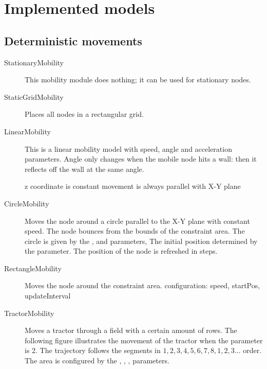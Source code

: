\section{Implemented models}

\subsection{Deterministic movements}

\begin{description}

\item[StationaryMobility] This mobility module does nothing;
it can be used for stationary nodes.

\item[StaticGridMobility] Places all nodes in a rectangular grid.


\item[LinearMobility] This is a linear mobility model with speed,
angle and acceleration parameters. Angle only changes when the mobile
node hits a wall: then it reflects off the wall at the same angle.

z coordinate is constant
movement is always parallel with X-Y plane


\item[CircleMobility] Moves the node around a circle parallel to the X-Y plane
with constant speed.
The node bounces from the bounds of the constraint area.
The circle is given by the ,  and  parameters,
The initial position determined by the  parameter.
The position of the node is refreshed in  steps.

\item[RectangleMobility] Moves the node around the constraint area.
configuration: speed, startPos, updateInterval

\item[TractorMobility] Moves a tractor through a field with a certain
amount of rows. The following figure illustrates the movement of the
tractor when the  parameter is 2. The trajectory follows
the segments in $1,2,3,4,5,6,7,8,1,2,3\ldots$ order. The area is configured
by the , , ,  parameters.


\end{description}
